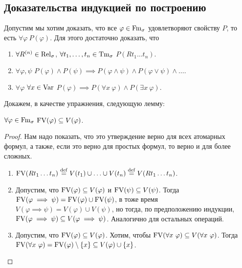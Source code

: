 \subsection{Доказательства индукцией по построению}
Допустим мы хотим доказать, что все $\varphi \in \mathrm{Fm}_{\sigma}$ удовлетворяют свойству $P$, то есть $\forall \varphi~P(\varphi)$.
Для этого достаточно доказать, что
\begin{enumerate}
    \item $\forall R^{(n)} \in \mathrm{Rel}_{\sigma}$, $\forall t_{1}, \ldots, t_{n} \in \mathrm{Tm}_{\sigma}$ $P(R t_{1} \ldots t_{n})$.
    \item $\forall \varphi, \psi$ $P(\varphi) \land P(\psi) \implies P(\varphi \land \psi) \land P(\varphi \lor \psi) \land \ldots$.
    \item $\forall \varphi$ $\forall x \in \mathrm{Var}$ $P(\varphi) \implies P(\forall x~ \varphi) \land P(\exists x~\varphi)$.
\end{enumerate}
Докажем, в качестве упражнения, следующую лемму:
\begin{lemma}
    $\forall \varphi \in \mathrm{Fm}_{\sigma}$ $\mathrm{FV}(\varphi) \subseteq V(\varphi)$.
\end{lemma}
\begin{proof}
    Нам надо показать, что это утверждение верно для всех атомарных формул, а также, если это верно для простых формул, то верно и для более сложных.
    \begin{enumerate}
        \item $\mathrm{FV}(R t_{1} \ldots t_{n}) \overset{\mathrm{def}}{=} V(t_{1}) \cup \ldots \cup V(t_{n}) \overset{\mathrm{def}}{=} V(R t_{1} \ldots t_{n})$.
        \item Допустим, что $\mathrm{FV}(\varphi) \subseteq V(\varphi)$ и $\mathrm{FV}(\psi) \subseteq V(\psi)$.
        Тогда $\mathrm{FV}(\varphi \implies \psi) = \mathrm{FV}(\varphi) \cup \mathrm{FV}(\psi)$, в тоже время $V(\varphi \implies \psi) = V(\varphi) \cup V(\psi)$, но тогда, по предположению индукции, $\mathrm{FV}(\varphi \implies \psi) \subseteq V(\varphi \implies \psi)$.
        Аналогично для остальных операций.
        \item Допустим, что $\mathrm{FV}(\varphi) \subseteq V(\varphi)$.
        Хотим, чтобы $\mathrm{FV}(\forall x~\varphi) \subseteq V(\forall x~\varphi)$.
        Тогда $\mathrm{FV}(\forall x~\varphi) = \mathrm{FV}(\varphi) \setminus \{x\} \subseteq V(\varphi) \cup \{x\}$. \qedhere
    \end{enumerate}
\end{proof}

